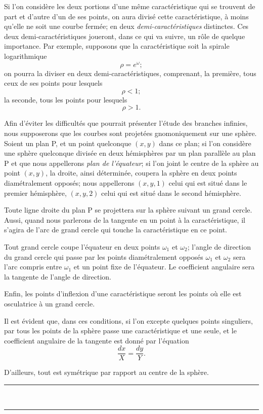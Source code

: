 \documentclass[11pt]{article}
\newcommand{\ornament}{\begin{center}\rule{2.5em}{0.4pt}\,\raisebox{0.1ex}{\tiny$\bullet\bullet\bullet$}\,\rule{2.5em}{0.4pt}\end{center}}
\begin{document}
Si l’on considère les deux portions d’une même caractéristique qui se trouvent de part et d’autre d’un de ses points, on aura divisé cette caractéristique, à moins qu’elle ne soit une courbe fermée; en deux \emph{demi-caractéristiques} distinctes. Ces deux demi-caractéristiques joueront, dans ce qui va suivre, un rôle de quelque importance. Par exemple, supposons que la caractéristique soit la spirale logarithmique
\[
\rho=e^{\omega};
\]
on pourra la diviser en deux demi-caractéristiques, comprenant, la première, tous ceux de ses points pour lesquels
\[
\rho<1;
\]
la seconde, tous les points pour lesquels
\[
\rho>1.
\]

Afin d’éviter les difficultés que pourrait présenter l’étude des branches infinies, nous supposerons que les courbes sont projetées gnomoniquement sur une sphère. Soient un plan P, et un point quelconque $(x,y)$ dans ce plan; si l’on considère une sphère quelconque divisée en deux hémisphères par un plan parallèle au plan P et que nous appellerons \emph{plan de l’équateur}; si l’on joint le centre de la sphère au point $(x,y)$, la droite, ainsi déterminée, coupera la sphère en deux points diamétralement opposés; nous appellerons $(x,y,1)$ celui qui est situé dans le premier hémisphère, $(x,y,2)$ celui qui est situé dans le second hémisphère.

Toute ligne droite du plan P se projettera sur la sphère suivant un grand cercle. Aussi, quand nous parlerons de la tangente en un point à la caractéristique, il s’agira de l’arc de grand cercle qui touche la caractéristique en ce point.

Tout grand cercle coupe l’équateur en deux points $\omega_1$ et $\omega_2$; l’angle de direction du grand cercle qui passe par les points diamétralement opposés $\omega_1$ et $\omega_2$ sera l’arc compris entre $\omega_1$ et un point fixe de l’équateur. Le coefficient angulaire sera la tangente de l’angle de direction.

Enfin, les points d’inflexion d’une caractéristique seront les points où elle est osculatrice à un grand cercle.

Il est évident que, dans ces conditions, si l’on excepte quelques points singuliers, par tous les points de la sphère passe une caractéristique et une seule, et le coefficient angulaire de la tangente est donné par l’équation
\[
\frac{dx}{X}=\frac{dy}{Y}.
\]

D’ailleurs, tout est symétrique par rapport au centre de la sphère.

\ornament
\end{document}
